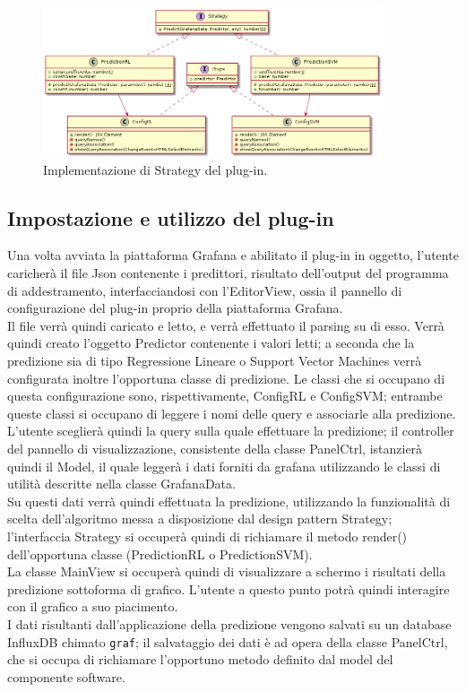 \documentclass[../manuale-sviluppatore.tex]{subfiles}
\begin{document}
\begin{figure}[H]
  \centering
  \includegraphics[width=10cm]{img/plugin/strategy.png}
  \caption{Implementazione di Strategy del plug-in.}
\end{figure}


\subsection{Impostazione e utilizzo del plug-in}
Una volta avviata la piattaforma Grafana e abilitato il plug-in in oggetto, l'utente caricherà il file Json contenente i predittori, risultato dell'output del programma di addestramento, interfacciandosi con l'EditorView, ossia il pannello di configurazione del plug-in proprio della piattaforma Grafana. \\
Il file verrà quindi caricato e letto, e verrà effettuato il parsing su di esso. Verrà quindi creato l'oggetto Predictor contenente i valori letti; a seconda che la predizione sia di tipo Regressione Lineare o Support Vector Machines verrà configurata inoltre l'opportuna classe di predizione. Le classi che si occupano di questa configurazione sono, rispettivamente, ConfigRL e ConfigSVM; entrambe queste classi si occupano di leggere i nomi delle query e associarle alla predizione. \\
L'utente sceglierà quindi la query sulla quale effettuare la predizione; il controller del pannello di visualizzazione, consistente della classe PanelCtrl, istanzierà quindi il Model, il quale leggerà i dati forniti da grafana utilizzando le classi di utilità descritte nella classe GrafanaData. \\
Su questi dati verrà quindi effettuata la predizione, utilizzando la funzionalità di scelta dell'algoritmo messa a disposizione dal design pattern Strategy; l'interfaccia Strategy si occuperà quindi di richiamare il metodo render() dell'opportuna classe (PredictionRL o PredictionSVM). \\
La classe MainView si occuperà quindi di visualizzare a schermo i risultati della predizione sottoforma di grafico. L'utente a questo punto potrà quindi interagire con il grafico a suo piacimento. \\
I dati risultanti dall'applicazione della predizione vengono salvati su un database InfluxDB chimato \texttt{graf}; il salvataggio dei dati è ad opera della classe PanelCtrl, che si occupa di richiamare l'opportuno metodo definito dal model del componente software.
\end{document}
